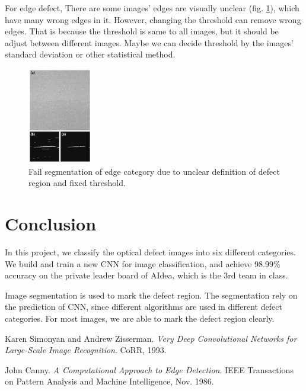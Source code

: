 \documentclass[conference]{IEEEtran}
\begin{document}
\begin{CJK}{UTF8}{bsmi}
For edge defect, There are some images' edges are visually unclear (fig. \ref{fig:Edge2}), which have many wrong edges in it. However, changing the threshold can remove wrong edges. That is because the threshold is same to all images, but it should be adjust between different images. Maybe we can decide threshold by the images' standard deviation or other statistical method.

\begin{figure}[!htbp]
\centerline{\includegraphics[width=0.25\textwidth]{../figures/Wrong.png}}
\caption{Fail segmentation of edge category due to unclear definition of defect region and fixed threshold.}
\label{fig:Edge2}
\end{figure}

\section{Conclusion}
In this project, we classify the optical defect images into six different categories. We build and train a new CNN for image classification, and achieve 98.99\% accuracy on the private leader board of AIdea, which is the 3rd team in class.

Image segmentation is used to mark the defect region. The segmentation rely on the prediction of CNN, since different algorithms are used in different defect categories. For most images, we are able to mark the defect region clearly.

\newpage
\begin{thebibliography}{00}

Karen Simonyan and Andrew Zisserman.
\textit{Very Deep Convolutional Networks for Large-Scale Image Recognition}. 
CoRR, 1993.
 
John Canny.
\textit{A Computational Approach to Edge Detection}.
IEEE Transactions on Pattern Analysis and Machine Intelligence, Nov. 1986.

\end{thebibliography}


\end{CJK}
\end{document}
